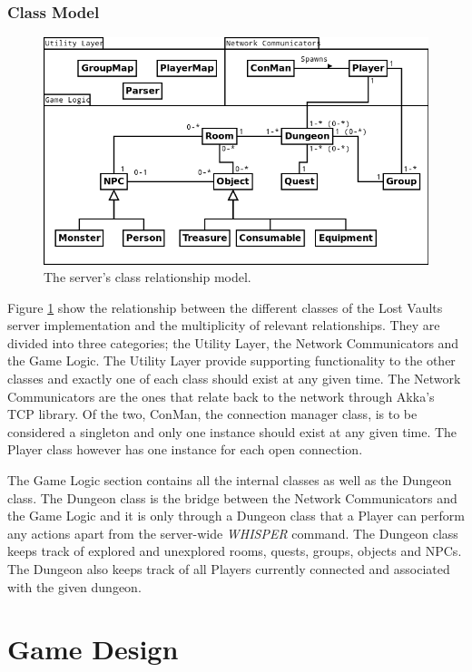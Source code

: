 \documentclass[a4paper]{article}
\begin{document}
\subsubsection{Class Model}
\begin{figure}[ht]
\centering
\includegraphics[width=1.0\textwidth]{serveruml1}
\caption{\label{fig:ServerUML}The server's class relationship model.}
\end{figure}
Figure \ref{fig:ServerUML} show the relationship between the different classes of the Lost Vaults server implementation and the multiplicity of relevant relationships. They are divided 
into three categories; the Utility Layer, the Network Communicators and the Game Logic. The Utility Layer provide supporting functionality to the other classes and exactly one of each 
class should exist at any given time. The Network Communicators are the ones that relate back to the network through Akka's TCP library. Of the two, ConMan, the connection manager class, 
is to be considered a singleton and only one instance should exist at any given time. The Player class however has one instance for each open connection.

The Game Logic section contains all the internal classes as well as the Dungeon class. The Dungeon class is the bridge between the Network Communicators and the Game Logic and it is 
only through a Dungeon class that a Player can perform any actions apart from the server-wide \textit{WHISPER} command. The Dungeon class keeps track of explored and unexplored rooms, 
quests, groups, objects and NPCs. The Dungeon also keeps track of all Players currently connected and associated with the given dungeon.
\section{Game Design}
\end{document}
